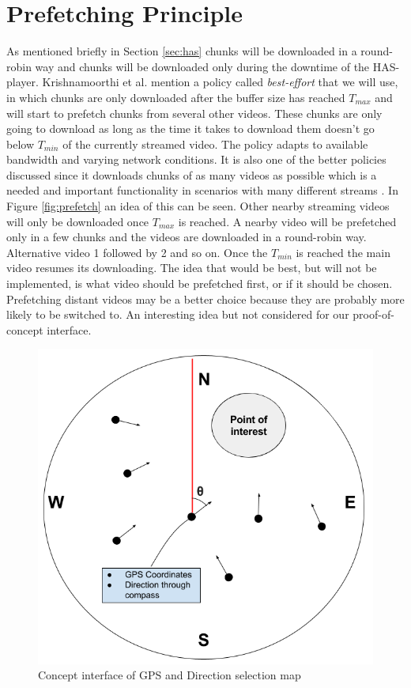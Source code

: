 \section{Prefetching Principle}
\label{sec:prefetching}

As mentioned briefly in Section \ref{sec:has} chunks will be downloaded in a round-robin way and chunks will be downloaded only during the downtime of the HAS-player. Krishnamoorthi et al. \cite{bandawarePrefetch} mention a policy called \textit{best-effort} that we will use, in which chunks are only downloaded after the buffer size has reached $T_{max}$ and will start to prefetch chunks from several other videos. These chunks are only going to download as long as the time it takes to download them doesn't go below $T_{min}$ of the currently streamed video. The policy adapts to available bandwidth and varying network conditions. It is also one of the better policies discussed since it downloads chunks of as many videos as possible which is a needed and important functionality in  scenarios with many different streams \cite{bandawarePrefetch}. In Figure \ref{fig:prefetch} an idea of this can be seen. Other nearby streaming videos will only be downloaded once $T_{max}$ is reached. A nearby video will be prefetched only in a few chunks and the videos are downloaded in a round-robin way. Alternative video 1 followed by 2 and so on. Once the $T_{min}$ is reached the main video resumes its downloading. The idea that would be best, but will not be implemented, is what video should be prefetched first, or if it should be chosen. Prefetching distant videos may be a better choice because they are probably more likely to be switched to. An interesting idea but not considered for our proof-of-concept interface.

\begin{figure}[t!]
\begin{center}
	\includegraphics[scale=0.6]{teomet.png}
	\caption{Concept interface of GPS and Direction selection map}
	\label{fig:gpsinterface}
\end{center}
\end{figure}


